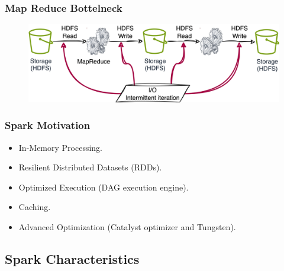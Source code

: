 \begin{frame}
    \frametitle{Map Reduce Bottelneck}
    \begin{figure}
        \includegraphics[width=.96\textwidth,height=.6\textheight]{./Figures/chapter-04/MR}\label{fig:figure4}
    \end{figure}
\end{frame}
\begin{frame}
    \frametitle{Spark Motivation}
    \begin{itemize}

        \item In-Memory Processing.

        \item Resilient Distributed Datasets (RDDs).%

        \item Optimized Execution (DAG execution engine).%

        \item Caching.%

        \item Advanced Optimization (Catalyst optimizer and Tungsten).%

    \end{itemize}
\end{frame}

\subsection{Spark Characteristics}\label{subsec:characteristics-apache-spark}

